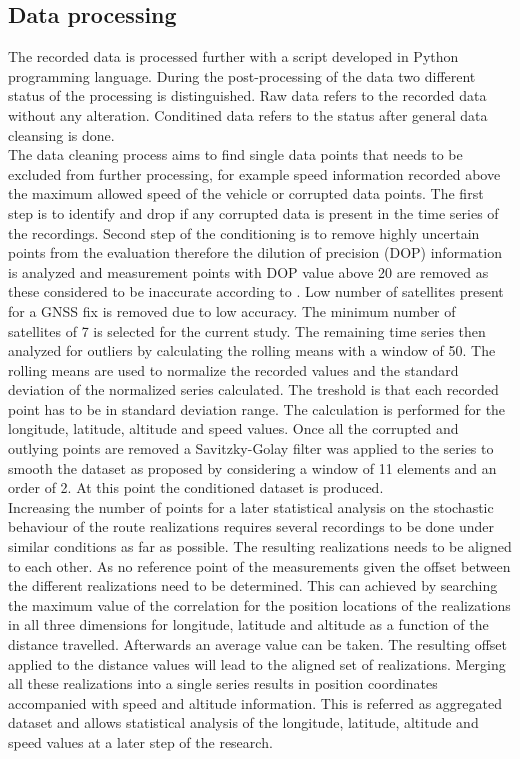 \documentclass{article}
\begin{document}
		\subsection{Data processing}
			The recorded data is processed further with a script developed in Python programming language. During the post-processing of the data two different status of the processing is distinguished. Raw data refers to the recorded data without any alteration. Conditined data refers to the status after general data cleansing is done. \\
			The data cleaning process aims to find single data points that needs to be excluded from further processing, for example speed information recorded above the maximum allowed speed of the vehicle or corrupted data points. The first step is to identify and drop if any corrupted data is present in the time series of the recordings. 
			Second step of the conditioning is to remove highly uncertain points from the evaluation therefore the dilution of precision (DOP) information is analyzed and measurement points with DOP value above 20 are removed as these considered to be inaccurate according to \cite{tahsinAnalysisDOPIts2015}. Low number of satellites present for a GNSS fix is removed due to low accuracy. The minimum number of satellites of 7 is selected for the current study. 
			The remaining time series then analyzed for outliers by calculating the rolling means with a window of 50. The rolling means are used to normalize the recorded values and the standard deviation of the normalized series calculated. The treshold is that each recorded point has to be in  standard deviation range. The calculation is performed for the longitude, latitude, altitude and speed values. Once all the corrupted and outlying points are removed a Savitzky-Golay filter was applied to the series to smooth the dataset as proposed by \cite{wilkDigitalFilteringRailway2020} considering a window of 11 elements and an order of 2. At this point the conditioned dataset is produced. \\
			Increasing the number of points for a later statistical analysis on the stochastic behaviour of the route realizations requires several recordings to be done under similar conditions as far as possible. The resulting realizations needs to be aligned to each other. As no reference point of the measurements given the offset between the different realizations need to be determined. This can achieved by searching the maximum value of the correlation for the position locations of the realizations in all three dimensions for longitude, latitude and altitude as a function of the distance travelled. Afterwards an average value can be taken. The resulting offset applied to the distance values will lead to the aligned set of realizations. Merging all these realizations into a single series results in position coordinates accompanied with speed and altitude information. This is referred as aggregated dataset and allows statistical analysis of the longitude, latitude, altitude and speed values at a later step of the research.		
\end{document}
